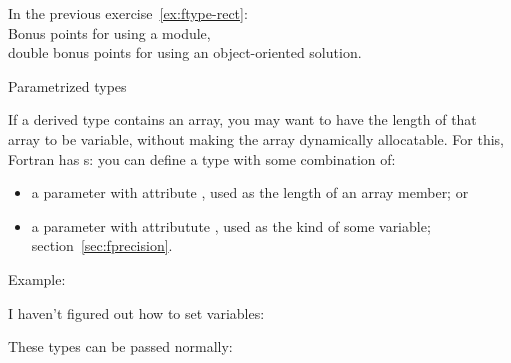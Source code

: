 \begin{exercise}
  In the previous exercise~\ref{ex:ftype-rect}:\\
  Bonus points for using a module,\\
  double bonus points for using an object-oriented solution.
\end{exercise}

 {Parametrized types}

If a derived type contains an array,
you may want to have the length of that array
to be variable, without making the array dynamically allocatable.
For this, Fortran has s:
you can define a type with some combination of:
\begin{itemize}
\item a parameter with attribute ,
  used as the length of an array member; or
\item a parameter with attributute ,
  used as the kind of some variable; section~\ref{sec:fprecision}.
\end{itemize}

Example:

I haven't figured out how to set variables:

These types can be passed normally:
